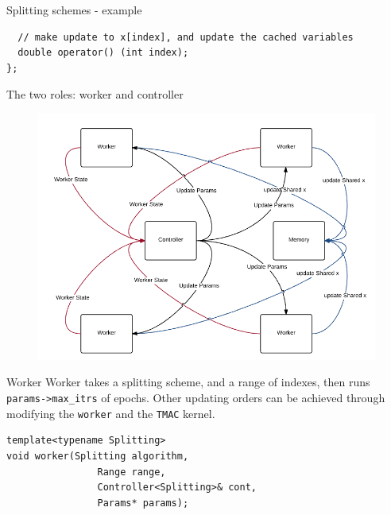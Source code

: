 \documentclass[hyperref,handout,compress,9pt,mathserif]{beamer}
\begin{document}
\begin{frame}[fragile]{Splitting schemes - example}
\begin{small}
\begin{lstlisting}
  // make update to x[index], and update the cached variables                                                                                                                                                                                   
  double operator() (int index);                                                                                                                                          
};                                                                                                                                                                                   
\end{lstlisting}
\end{small}

\end{frame}


\begin{frame}{The two roles: worker and controller}
\begin{figure}[!h]
        \centering
                \includegraphics[width=.95\textwidth]{./figs/shared_arch.png}
\end{figure}
\end{frame}

\begin{frame}[fragile]{Worker}
Worker takes a splitting scheme, and a range of indexes, then runs \texttt{params->max\_itrs} of epochs. Other updating orders can be achieved through modifying the \texttt{worker} and the \texttt{TMAC} kernel.
\begin{lstlisting}
template<typename Splitting>
void worker(Splitting algorithm, 
	            Range range, 
	            Controller<Splitting>& cont, 
	            Params* params);
\end{lstlisting}

\end{frame}
\end{document}
